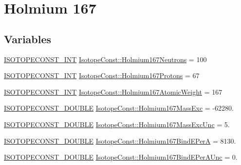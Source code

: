 \hypertarget{group___isotope_const-_holmium-_ho167}{}\section{Holmium 167}
\label{group___isotope_const-_holmium-_ho167}
\subsection*{Variables}
\begin{DoxyCompactItemize}
\item 
\mbox{\hyperlink{group___isotope_const-_macros_ga5f18360b3e99483a35c32d789e62621c}{I\+S\+O\+T\+O\+P\+E\+C\+O\+N\+S\+T\+\_\+\+I\+NT}} \mbox{\hyperlink{group___isotope_const-_holmium-_ho167_gab5bdddb60fe92feeaca56454853a9e44}{Isotope\+Const\+::\+Holmium167\+Neutrons}} = 100
\item 
\mbox{\hyperlink{group___isotope_const-_macros_ga5f18360b3e99483a35c32d789e62621c}{I\+S\+O\+T\+O\+P\+E\+C\+O\+N\+S\+T\+\_\+\+I\+NT}} \mbox{\hyperlink{group___isotope_const-_holmium-_ho167_gaea8d0fbc84e1f68071695b97059cea5d}{Isotope\+Const\+::\+Holmium167\+Protons}} = 67
\item 
\mbox{\hyperlink{group___isotope_const-_macros_ga5f18360b3e99483a35c32d789e62621c}{I\+S\+O\+T\+O\+P\+E\+C\+O\+N\+S\+T\+\_\+\+I\+NT}} \mbox{\hyperlink{group___isotope_const-_holmium-_ho167_ga2782f96d8a4fa9fd8e56e6d29b1badde}{Isotope\+Const\+::\+Holmium167\+Atomic\+Weight}} = 167
\item 
\mbox{\hyperlink{group___isotope_const-_macros_ga8f45a7272ce02c0b4c65c44636ed719a}{I\+S\+O\+T\+O\+P\+E\+C\+O\+N\+S\+T\+\_\+\+D\+O\+U\+B\+LE}} \mbox{\hyperlink{group___isotope_const-_holmium-_ho167_ga9f184f576cce2558b4656512867b4fdc}{Isotope\+Const\+::\+Holmium167\+Mass\+Exc}} = -\/62280.
\item 
\mbox{\hyperlink{group___isotope_const-_macros_ga8f45a7272ce02c0b4c65c44636ed719a}{I\+S\+O\+T\+O\+P\+E\+C\+O\+N\+S\+T\+\_\+\+D\+O\+U\+B\+LE}} \mbox{\hyperlink{group___isotope_const-_holmium-_ho167_ga4e5f99f06edbf848e4c4705d29bfa07f}{Isotope\+Const\+::\+Holmium167\+Mass\+Exc\+Unc}} = 5.
\item 
\mbox{\hyperlink{group___isotope_const-_macros_ga8f45a7272ce02c0b4c65c44636ed719a}{I\+S\+O\+T\+O\+P\+E\+C\+O\+N\+S\+T\+\_\+\+D\+O\+U\+B\+LE}} \mbox{\hyperlink{group___isotope_const-_holmium-_ho167_ga78df2eb526cde6575f34e2ad77a19c6f}{Isotope\+Const\+::\+Holmium167\+Bind\+E\+PerA}} = 8130.
\item 
\mbox{\hyperlink{group___isotope_const-_macros_ga8f45a7272ce02c0b4c65c44636ed719a}{I\+S\+O\+T\+O\+P\+E\+C\+O\+N\+S\+T\+\_\+\+D\+O\+U\+B\+LE}} \mbox{\hyperlink{group___isotope_const-_holmium-_ho167_ga5f39b6b70655fe6a05ee796bcdf82a7f}{Isotope\+Const\+::\+Holmium167\+Bind\+E\+Per\+A\+Unc}} = 0.

\end{DoxyCompactItemize}
